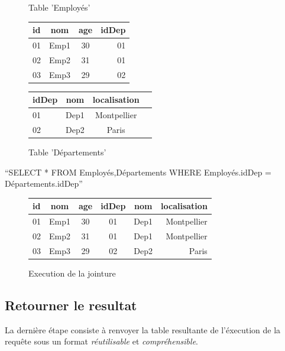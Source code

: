 \documentclass[oneside,13pt,a4paper]{report}
\begin{document}
\begin{figure}[h]
	\begin{minipage}[c]{.46\linewidth}
		\centering
		\caption{Table 'Employés'}
		\begin{tabular}{|l|c|c|r|}
			\hline
			id & nom  & age & idDep
			\\
			\hline
			01 & Emp1 & 30  & 01    \\
			02 & Emp2 & 31  & 01    \\
			03 & Emp3 & 29  & 02    \\
			\hline
		\end{tabular}
	\end{minipage}
	\hfill%
	\begin{minipage}[c]{.46\linewidth}
		\centering
		\caption{Table 'Départements'}
		\begin{tabular}{|l|c|c|r|}
			\hline
			idDep & nom  & localisation
			\\
			\hline
			01    & Dep1 & Montpellier  \\
			02    & Dep2 & Paris        \\
			\hline
		\end{tabular}
	\end{minipage}
\end{figure}

\enquote{SELECT * FROM Employés,Départements WHERE Employés.idDep = Départements.idDep}

\begin{figure}[h]
	\centering
	\caption{Execution de la jointure}
	\begin{tabular}{|l|c|c|c|c|r|}
		\hline
		id & nom  & age & idDep & nom  & localisation
		\\
		\hline
		01 & Emp1 & 30  & 01    & Dep1 & Montpellier  \\
		02 & Emp2 & 31  & 01    & Dep1 & Montpellier  \\
		03 & Emp3 & 29  & 02    & Dep2 & Paris        \\
		\hline
	\end{tabular}
\end{figure}


\subsection{Retourner le resultat}

La dernière étape consiste à renvoyer la table resultante de l'éxecution de la requête sous un format \textit{réutilisable} et \textit{compréhensible}.
\end{document}
